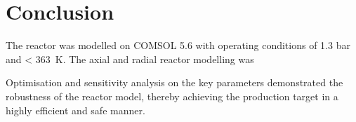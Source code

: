 \section{Conclusion} \label{sec:conclusion}
The reactor was modelled on COMSOL 5.6 with operating conditions of 1.3 bar and \SI{< 363}{\K}.
The axial and radial reactor modelling was 

Optimisation and sensitivity analysis on the key parameters demonstrated the robustness of the reactor model, thereby achieving the production target in a highly efficient and safe manner. 